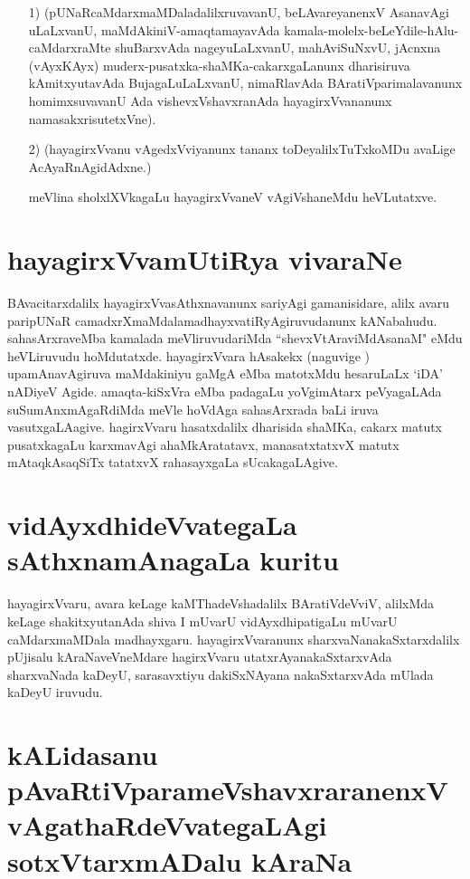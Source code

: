 \begin{itemize}
\item[1)] (pUNaRcaMdarxmaMDaladalilxruvavanU, beLAvareyanenxV AsanavAgi uLaLxvanU, maMdAkiniV-amaqtamayavAda kamala-molelx-beLeYdile-hAlu-caMdarxraMte shuBarxvAda nageyuLaLxvanU, mahAviSuNxvU, jAcnxna (vAyxKAyx) muderx-pusatxka-shaMKa-cakarxgaLanunx dharisiruva kAmitxyutavAda BujagaLuLaLxvanU, nimaRlavAda BAratiVparimalavanunx homimxsuvavanU Ada vishevxVshavxranAda hayagirxVvananunx namasakxrisutetxVne).
 
\item[2)] (hayagirxVvanu vAgedxVviyanunx tananx toDeyalilxTuTxkoMDu avaLige AcAyaRnAgidAdxne.)

meVlina sholxlXVkagaLu hayagirxVvaneV vAgiVshaneMdu heVLutatxve.
\end{itemize}

\section*{hayagirxVvamUtiRya vivaraNe}

BAvacitarxdalilx hayagirxVvasAthxnavanunx sariyAgi gamanisidare, alilx avaru paripUNaR camadxrXmaMdalamadhayxvatiRyAgiruvudanunx kANabahudu. sahasArxraveMba kamalada meVliruvudariMda ``shevxVtAraviMdAsanaM" eMdu heVLiruvudu hoMdutatxde. hayagirxVvara hAsakekx (naguvige ) upamAnavAgiruva maMdakiniyu gaMgA eMba matotxMdu hesaruLaLx `iDA' nADiyeV Agide. amaqta-kiSxVra eMba padagaLu yoVgimAtarx peVyagaLAda suSumAnxmAgaRdiMda meVle hoVdAga sahasArxrada baLi iruva vasutxgaLAagive. hagirxVvaru hasatxdalilx dharisida shaMKa, cakarx matutx pusatxkagaLu karxmavAgi ahaMkAratatavx, manasatxtatxvX matutx mAtaqkAsaqSiTx tatatxvX rahasayxgaLa sUcakagaLAgive.

\section*{vidAyxdhideVvategaLa sAthxnamAnagaLa kuritu}

hayagirxVvaru, avara keLage kaMThadeVshadalilx BAratiVdeVviV, alilxMda keLage shakitxyutanAda shiva I mUvarU vidAyxdhipatigaLu mUvarU caMdarxmaMDala madhayxgaru. hayagirxVvaranunx sharxvaNanakaSxtarxdalilx pUjisalu kAraNaveVneMdare hagirxVvaru utatxrAyanakaSxtarxvAda sharxvaNada kaDeyU, sarasavxtiyu dakiSxNAyana nakaSxtarxvAda mUlada kaDeyU iruvudu.

\section*{kALidasanu pAvaRtiVparameVshavxraranenxV vAgathaRdeVvategaLAgi sotxVtarxmADalu kAraNa}

